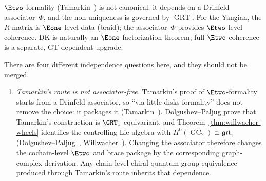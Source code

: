 \begin{remark}
\label{rem:grothendieck-teichmuller}
$\Etwo$ formality (Tamarkin~\cite{Tamarkin00}) is not canonical:
it depends on a Drinfeld associator~$\Phi$, and the non-uniqueness
is governed by $\operatorname{GRT}$. For the Yangian, the
$R$-matrix is $\Eone$-level data (braid); the associator~$\Phi$
provides $\Etwo$-level coherence. DK is naturally an
$\Eone$-factorization theorem; full $\Etwo$ coherence is a
separate, GT-dependent upgrade.
\end{remark}

\begin{remark}
\label{rem:associator-independence-research}
There are four different independence questions here, and they should
not be merged.

\begin{enumerate}[label=\textup{(\roman*)}]
\item \emph{Tamarkin's route is not associator-free.}
 Tamarkin's proof of $\Etwo$-formality starts from a Drinfeld
 associator, so ``via little disks formality'' does not remove the
 choice: it packages it
 \textup{(}Tamarkin~\cite{Tamarkin03}\textup{)}.
 Dolgushev--Paljug prove that Tamarkin's construction is
 $\GRT_1$-equivariant, and Theorem~\ref{thm:willwacher-wheels}
 identifies the controlling Lie algebra with
 $H^0(\operatorname{GC}_2) \cong \mathfrak{grt}_1$
 \textup{(}Dolgushev--Paljug~\cite{DolgushevPaljug16},
 Willwacher~\cite{Willwacher15}\textup{)}.
 Changing the associator therefore changes the cochain-level
 $\Etwo$ and brace package by the corresponding graph-complex
 derivation. Any chain-level chiral quantum-group equivalence produced
 through Tamarkin's route inherits that dependence.


\end{enumerate}
\end{remark}
